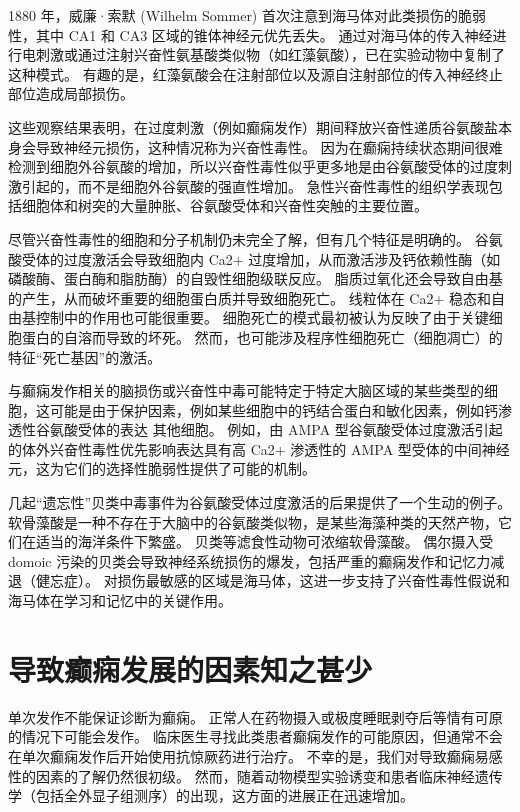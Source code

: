 1880 年，威廉·索默 (Wilhelm Sommer) 首次注意到海马体对此类损伤的脆弱性，其中 CA1 和 CA3 区域的锥体神经元优先丢失。 通过对海马体的传入神经进行电刺激或通过注射兴奋性氨基酸类似物（如红藻氨酸），已在实验动物中复制了这种模式。 有趣的是，红藻氨酸会在注射部位以及源自注射部位的传入神经终止部位造成局部损伤。

这些观察结果表明，在过度刺激（例如癫痫发作）期间释放兴奋性递质谷氨酸盐本身会导致神经元损伤，这种情况称为兴奋性毒性。 因为在癫痫持续状态期间很难检测到细胞外谷氨酸的增加，所以兴奋性毒性似乎更多地是由谷氨酸受体的过度刺激引起的，而不是细胞外谷氨酸的强直性增加。 急性兴奋性毒性的组织学表现包括细胞体和树突的大量肿胀、谷氨酸受体和兴奋性突触的主要位置。

尽管兴奋性毒性的细胞和分子机制仍未完全了解，但有几个特征是明确的。 谷氨酸受体的过度激活会导致细胞内 Ca2+ 过度增加，从而激活涉及钙依赖性酶（如磷酸酶、蛋白酶和脂肪酶）的自毁性细胞级联反应。 脂质过氧化还会导致自由基的产生，从而破坏重要的细胞蛋白质并导致细胞死亡。 线粒体在 Ca2+ 稳态和自由基控制中的作用也可能很重要。 细胞死亡的模式最初被认为反映了由于关键细胞蛋白的自溶而导致的坏死。 然而，也可能涉及程序性细胞死亡（细胞凋亡）的特征“死亡基因”的激活。

与癫痫发作相关的脑损伤或兴奋性中毒可能特定于特定大脑区域的某些类型的细胞，这可能是由于保护因素，例如某些细胞中的钙结合蛋白和敏化因素，例如钙渗透性谷氨酸受体的表达 其他细胞。 例如，由 AMPA 型谷氨酸受体过度激活引起的体外兴奋性毒性优先影响表达具有高 Ca2+ 渗透性的 AMPA 型受体的中间神经元，这为它们的选择性脆弱性提供了可能的机制。

几起“遗忘性”贝类中毒事件为谷氨酸受体过度激活的后果提供了一个生动的例子。 软骨藻酸是一种不存在于大脑中的谷氨酸类似物，是某些海藻种类的天然产物，它们在适当的海洋条件下繁盛。 贝类等滤食性动物可浓缩软骨藻酸。 偶尔摄入受 domoic 污染的贝类会导致神经系统损伤的爆发，包括严重的癫痫发作和记忆力减退（健忘症）。 对损伤最敏感的区域是海马体，这进一步支持了兴奋性毒性假说和海马体在学习和记忆中的关键作用。


\section{导致癫痫发展的因素知之甚少}
单次发作不能保证诊断为癫痫。 正常人在药物摄入或极度睡眠剥夺后等情有可原的情况下可能会发作。 临床医生寻找此类患者癫痫发作的可能原因，但通常不会在单次癫痫发作后开始使用抗惊厥药进行治疗。 不幸的是，我们对导致癫痫易感性的因素的了解仍然很初级。 然而，随着动物模型实验诱变和患者临床神经遗传学（包括全外显子组测序）的出现，这方面的进展正在迅速增加。

